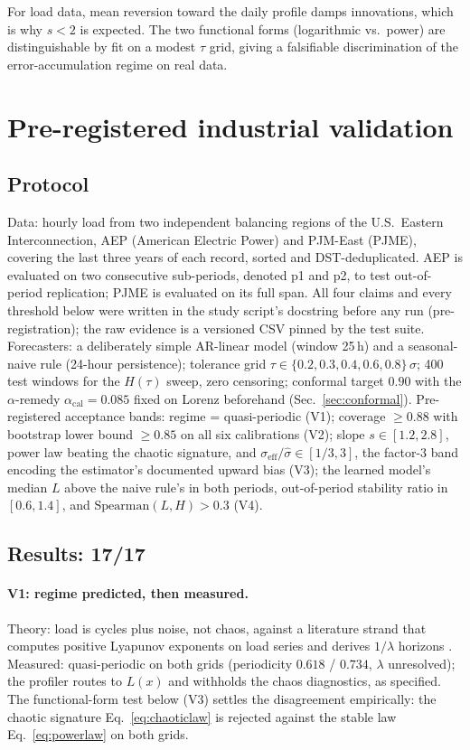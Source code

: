 \documentclass[aps,pre,twocolumn,superscriptaddress,nofootinbib,longbibliography]{revtex4-2}
\newcommand{\eff}{\mathrm{eff}}
\begin{document}
For load data, mean reversion toward the daily profile damps innovations,
which is why $s < 2$ is expected. The two functional forms (logarithmic
vs.\ power) are distinguishable by fit on a modest $\tau$ grid, giving a
falsifiable discrimination of the error-accumulation regime on real data.

\section{Pre-registered industrial validation}
\label{sec:industrial}

\subsection{Protocol}

Data: hourly load from two independent balancing regions of the U.S.\
Eastern Interconnection, AEP (American Electric Power) and PJM-East
(PJME), covering the last three years of each record, sorted and
DST-deduplicated. AEP is evaluated on two consecutive sub-periods,
denoted p1 and p2, to test out-of-period replication; PJME is evaluated
on its full span. All four claims and every threshold below were written
in the study script's docstring before any run (pre-registration); the
raw evidence is a versioned CSV pinned by the test suite. Forecasters: a
deliberately simple AR-linear model (window 25\,h) and a seasonal-naive
rule (24-hour persistence); tolerance grid
$\tau \in \{0.2, 0.3, 0.4, 0.6, 0.8\}\,\sigma$; 400 test windows for the
$H(\tau)$ sweep, zero censoring; conformal target $0.90$ with the
$\alpha$-remedy $\alpha_{\mathrm{cal}} = 0.085$ fixed on Lorenz
beforehand (Sec.~\ref{sec:conformal}). Pre-registered acceptance bands:
regime = quasi-periodic (V1); coverage $\ge 0.88$ with bootstrap lower
bound $\ge 0.85$ on all six calibrations (V2); slope $s \in [1.2, 2.8]$,
power law beating the chaotic signature, and
$\sigma_\eff/\hat\sigma \in [1/3, 3]$, the factor-3 band encoding the
estimator's documented upward bias (V3); the learned model's median $L$
above the naive rule's in both periods, out-of-period stability ratio in
$[0.6, 1.4]$, and $\mathrm{Spearman}(L, H) > 0.3$ (V4).

\subsection{Results: 17/17}

\paragraph{V1: regime predicted, then measured.} Theory: load is cycles
plus noise, not chaos, against a literature strand that computes positive
Lyapunov exponents on load series and derives $1/\lambda$ horizons
\citep{li2011application,stergiou2021application}. Measured:
quasi-periodic on both grids (periodicity $0.618$ / $0.734$, $\lambda$
unresolved); the profiler routes to $L(x)$ and withholds the chaos
diagnostics, as specified. The functional-form test below (V3) settles
the disagreement empirically: the chaotic signature
Eq.~\eqref{eq:chaoticlaw} is rejected against the stable law
Eq.~\eqref{eq:powerlaw} on both grids.
\end{document}
